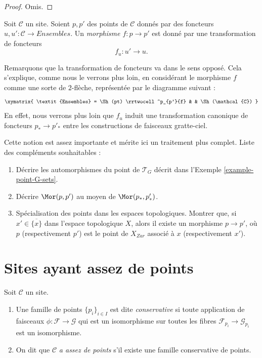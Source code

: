 \begin{proof}
Omis.
\end{proof}

\begin{definition}
\label{definition-morphism-points}
Soit $\mathcal{C}$ un site. Soient $p, p'$ des points de $\mathcal{C}$
donnés par des foncteurs $u, u' : \mathcal{C} \to \textit{Ensembles}$.
Un {\it morphisme $f : p \to p'$} est donné par une transformation de
foncteurs
$$
f_u : u' \to u.
$$
\end{definition}

\noindent
Remarquons que la transformation de foncteurs va dans le sens opposé.
Cela s’explique, comme nous le verrons plus loin, en considérant
le morphisme $f$ comme une sorte de $2$-flèche, représentée par le diagramme
suivant :
$$
\xymatrix{
\textit{Ensembles}
=
\Sh(pt)
\rrtwocell^p_{p'}{f}
&
&
\Sh(\mathcal{C})
}
$$
En effet, nous verrons plus loin que $f_u$ induit une transformation
canonique de foncteurs $p_* \to p'_*$ entre les
constructions de faisceaux gratte-ciel.

\medskip\noindent
Cette notion est assez importante et mérite ici un traitement plus complet.
Liste des compléments souhaitables :
\begin{enumerate}
\item Décrire les automorphismes du point de $\mathcal{T}_G$
décrit dans l’Exemple \ref{example-point-G-sets}.
\item Décrire $\Mor(p, p')$ au moyen de $\Mor(p_*, p'_*)$.
\item Spécialisation des points dans les espaces topologiques.
Montrer que, si $x' \in \overline{\{x\}}$ dans l’espace topologique
$X$, alors il existe un morphisme $p \to p'$, où $p$ (respectivement $p'$)
est le point de $X_{Zar}$ associé à $x$ (respectivement $x'$).
\end{enumerate}




\section{Sites ayant assez de points}
\label{section-sites-enough-points}

\begin{definition}
\label{definition-enough-points}
Soit $\mathcal{C}$ un site.
\begin{enumerate}
\item Une famille de points $\{p_i\}_{i\in I}$ est dite {\it conservative}
si toute application de faisceaux $\phi : \mathcal{F} \to \mathcal{G}$
qui est un isomorphisme sur toutes les fibres $\mathcal{F}_{p_i}
\to \mathcal{G}_{p_i}$ est un isomorphisme.
\item On dit que $\mathcal{C}$ {\it a assez de points}
s’il existe une famille conservative de points.
\end{enumerate}
\end{definition}

